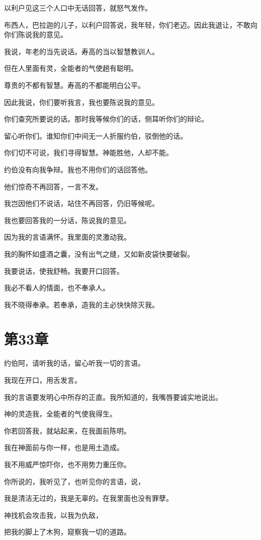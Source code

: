 \documentclass[12pt,oneside]{book}
\begin{document}
以利户见这三个人口中无话回答，就怒气发作。

布西人，巴拉迦的儿子，以利户回答说，我年轻，你们老迈。因此我退让，不敢向你们陈说我的意见。

我说，年老的当先说话。寿高的当以智慧教训人。

但在人里面有灵，全能者的气使趟有聪明。

尊贵的不都有智慧。寿高的不都能明白公平。

因此我说，你们要听我言，我也要陈说我的意见。

你们查究所要说的话。那时我等候你们的话，侧耳听你们的辩论。

留心听你们。谁知你们中间无一人折服约伯，驳倒他的话。

你们切不可说，我们寻得智慧。神能胜他，人却不能。

约伯没有向我争辩。我也不用你们的话回答他。

他们惊奇不再回答，一言不发。

我岂因他们不说话，站住不再回答，仍旧等候呢。

我也要回答我的一分话，陈说我的意见。

因为我的言语满怀。我里面的灵激动我。

我的胸怀如盛酒之囊，没有出气之缝，又如新皮袋快要破裂。

我要说话，使我舒畅。我要开口回答。

我必不看人的情面，也不奉承人。

我不晓得奉承。若奉承，造我的主必快快除灭我。


\chapter{第33章}
约伯阿，请听我的话，留心听我一切的言语。

我现在开口，用舌发言。

我的言语要发明心中所存的正直。我所知道的，我嘴唇要诚实地说出。

神的灵造我，全能者的气使我得生。

你若回答我，就站起来，在我面前陈明。

我在神面前与你一样，也是用土造成。

我不用威严惊吓你，也不用势力重压你。

你所说的，我听见了，也听见你的言语，说，

我是清洁无过的，我是无辜的。在我里面也没有罪孽。

神找机会攻击我，以我为仇敌，

把我的脚上了木狗，窥察我一切的道路。
\end{document}
